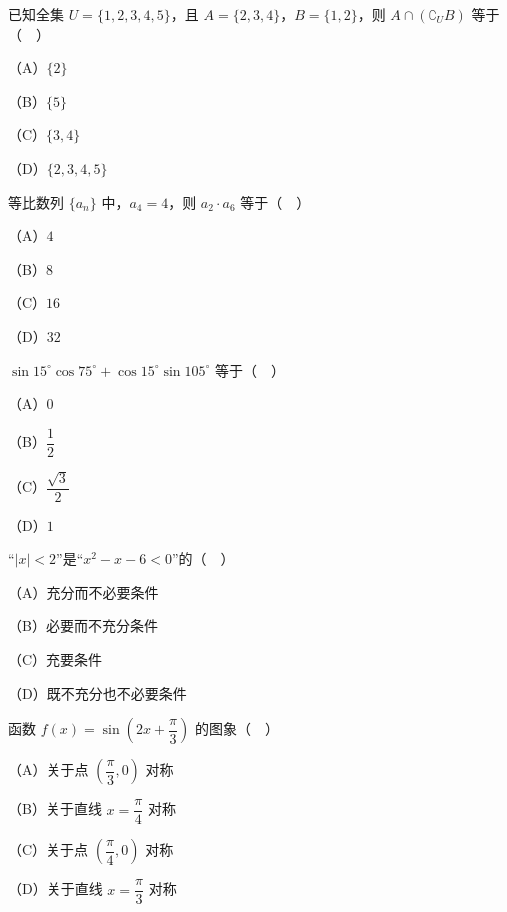 


\begin{question}
已知全集 $U=\{1,2,3,4,5\}$，且 $A=\{2,3,4\}$，$B=\{1,2\}$，则 $A\cap(\complement_UB)$ 等于（　）

（A）$\{2\}$

（B）$\{5\}$

（C）$\{3,4\}$

（D）$\{2,3,4,5\}$

\end{question}
\begin{question}
等比数列 $\{a_n\}$ 中，$a_4=4$，则 $a_2\cdot a_6$ 等于（　）

（A）$4$

（B）$8$

（C）$16$

（D）$32$

\end{question}
\begin{question}
$\sin15^\circ\cos75^\circ+\cos15^\circ\sin105^\circ$ 等于（　）

（A）$0$

（B）$\dfrac12$

（C）$\dfrac{\sqrt3}2$

（D）$1$

\end{question}
\begin{question}
“$|x|<2$”是“$x^2-x-6<0$”的（　）

（A）充分而不必要条件

（B）必要而不充分条件

（C）充要条件

（D）既不充分也不必要条件

\end{question}
\begingroup
\renewenvironment{question}{\Needspace{0.46\textheight}}{}
\begin{question}
函数 $f(x)=\sin\left(2x+\dfrac{\pi}3\right)$ 的图象（　）

（A）关于点 $\left(\dfrac{\pi}3,0\right)$ 对称

（B）关于直线 $x=\dfrac{\pi}4$ 对称

（C）关于点 $\left(\dfrac{\pi}4,0\right)$ 对称

（D）关于直线 $x=\dfrac{\pi}3$ 对称

\Needspace{0.4\textheight}
\end{question}
